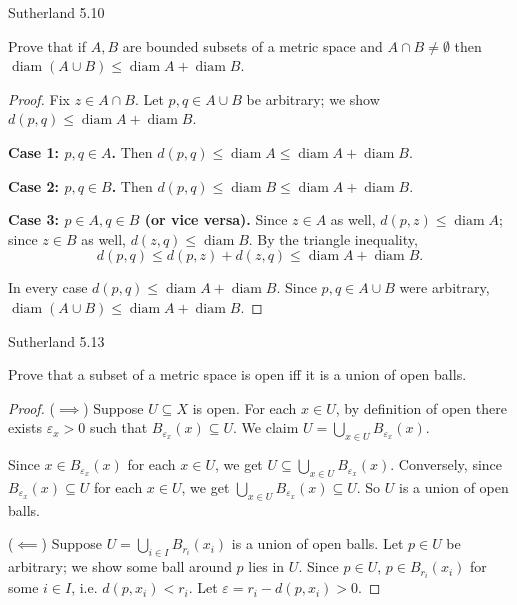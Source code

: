 \documentclass[minion]{homework}
\begin{document}
\begin{problems}
\problem Sutherland 5.10

Prove that if $A, B$ are bounded subsets of a metric space and
$A \cap B \ne \emptyset$ then $\operatorname{diam}(A \cup B) \le \operatorname{diam} A + \operatorname{diam} B$. \newline
\begin{proof}
  Fix $z \in A \cap B$. Let $p, q \in A \cup B$ be arbitrary; we show $d(p,q) \leq \operatorname{diam} A + \operatorname{diam} B$.

  \textbf{Case 1: $p, q \in A$.} Then $d(p,q) \leq \operatorname{diam} A \leq \operatorname{diam} A + \operatorname{diam} B$.

  \textbf{Case 2: $p, q \in B$.} Then $d(p,q) \leq \operatorname{diam} B \leq \operatorname{diam} A + \operatorname{diam} B$.

  \textbf{Case 3: $p \in A, q \in B$ (or vice versa).} Since $z \in A$ as well, $d(p,z) \leq \operatorname{diam} A$; since $z \in B$ as well, $d(z,q) \leq \operatorname{diam} B$. By the triangle inequality,
  $$d(p,q) \leq d(p,z) + d(z,q) \leq \operatorname{diam} A + \operatorname{diam} B.$$

  In every case $d(p,q) \leq \operatorname{diam} A + \operatorname{diam} B$. Since $p, q \in A \cup B$ were arbitrary, $\operatorname{diam}(A \cup B) \leq \operatorname{diam} A + \operatorname{diam} B$.
\end{proof}

\problem Sutherland 5.13

Prove that a subset of a metric space is open iff it is a union of open balls. \newline
\begin{proof}
  ($\implies$) Suppose $U \subseteq X$ is open. For each $x \in U$, by definition of open there exists $\varepsilon_x > 0$ such that $B_{\varepsilon_x}(x) \subseteq U$. We claim $U = \bigcup_{x \in U} B_{\varepsilon_x}(x)$.

  Since $x \in B_{\varepsilon_x}(x)$ for each $x \in U$, we get $U \subseteq \bigcup_{x \in U} B_{\varepsilon_x}(x)$. Conversely, since $B_{\varepsilon_x}(x) \subseteq U$ for each $x \in U$, we get $\bigcup_{x \in U} B_{\varepsilon_x}(x) \subseteq U$. So $U$ is a union of open balls.

  ($\impliedby$) Suppose $U = \bigcup_{i \in I} B_{r_i}(x_i)$ is a union of open balls. Let $p \in U$ be arbitrary; we show some ball around $p$ lies in $U$. Since $p \in U$, $p \in B_{r_i}(x_i)$ for some $i \in I$, i.e. $d(p,x_i) < r_i$. Let $\varepsilon = r_i - d(p,x_i) > 0$.


\end{proof}
\end{problems}
\end{document}
